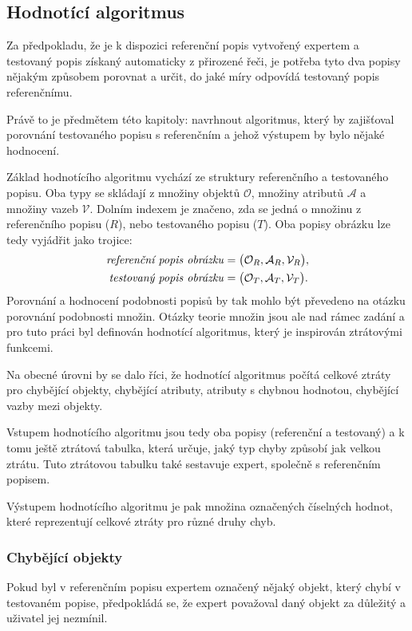 \subsection{Hodnotící algoritmus}\label{subsec:hodnoceni}
Za předpokladu, že je k dispozici referenční popis vytvořený expertem a testovaný popis získaný automaticky z přirozené řeči,
je potřeba tyto dva popisy nějakým způsobem porovnat a určit, do jaké míry odpovídá testovaný popis referenčnímu.

Právě to je předmětem této kapitoly: navrhnout algoritmus, který by zajišťoval porovnání testovaného popisu s referenčním a jehož výstupem by bylo nějaké hodnocení.

Základ hodnotícího algoritmu vychází ze struktury referenčního a testovaného popisu.
Oba typy se skládají z množiny objektů $\mathcal O$, množiny atributů $\mathcal A$ a množiny vazeb $\mathcal V$.
Dolním indexem je značeno, zda se jedná o množinu z referenčního popisu ($R$), nebo testovaného popisu ($T$).
Oba popisy obrázku lze tedy vyjádřit jako trojice:
\begin{align*}
	\text{\emph{referenční popis obrázku}} & = \bigl( \mathcal{O}_{R}, \mathcal{A}_{R}, \mathcal{V}_{R} \bigr), \\
	\text{\emph{testovaný popis obrázku}}  & = \bigl( \mathcal{O}_{T}, \mathcal{A}_{T}, \mathcal{V}_{T} \bigr).
\end{align*}
Porovnání a hodnocení podobnosti popisů by tak mohlo být převedeno na otázku porovnání podobnosti množin.
Otázky teorie množin jsou ale nad rámec zadání a pro tuto práci byl definován hodnotící algoritmus,
který je inspirován ztrátovými funkcemi.

Na obecné úrovni by se dalo říci, že hodnotící algoritmus počítá celkové ztráty pro chybějící objekty,
chybějící atributy, atributy s chybnou hodnotou, chybějící vazby mezi objekty.

Vstupem hodnotícího algoritmu jsou tedy oba popisy (referenční a testovaný) a k tomu ještě ztrátová tabulka,
která určuje, jaký typ chyby způsobí jak velkou ztrátu.
Tuto ztrátovou tabulku také sestavuje expert, společně s referenčním popisem.

Výstupem hodnotícího algoritmu je pak množina označených číselných hodnot, které reprezentují celkové ztráty pro různé druhy chyb.

\subsubsection{Chybějící objekty}
Pokud byl v referenčním popisu expertem označený nějaký objekt,
který chybí v testovaném popise, předpokládá se, že expert považoval daný objekt za důležitý a uživatel jej nezmínil.

